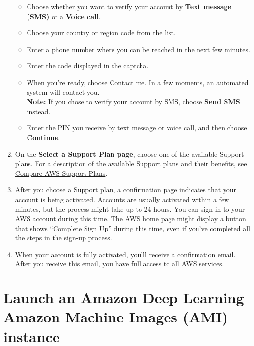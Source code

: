 \documentclass[]{book}
\providecommand{\tightlist}{%
  \setlength{\itemsep}{0pt}\setlength{\parskip}{0pt}}
\begin{document}
\begin{enumerate}
  \begin{itemize}
  \tightlist
  \item
    Choose whether you want to verify your account by \textbf{Text message (SMS)} or a \textbf{Voice call}.
  \item
    Choose your country or region code from the list.
  \item
    Enter a phone number where you can be reached in the next few minutes.
  \item
    Enter the code displayed in the captcha.
  \item
    When you're ready, choose Contact me. In a few moments, an automated system will contact you.\\
    \textbf{Note:} If you chose to verify your account by SMS, choose \textbf{Send SMS} instead.
  \item
    Enter the PIN you receive by text message or voice call, and then choose \textbf{Continue}.
  \end{itemize}
\item
  On the \textbf{Select a Support Plan page}, choose one of the available Support plans. For a description of the available Support plans and their benefits, see \href{https://aws.amazon.com/premiumsupport/plans/}{Compare AWS Support Plans}.
\item
  After you choose a Support plan, a confirmation page indicates that your account is being activated. Accounts are usually activated within a few minutes, but the process might take up to 24 hours. You can sign in to your AWS account during this time. The AWS home page might display a button that shows ``Complete Sign Up'' during this time, even if you've completed all the steps in the sign-up process.
\item
  When your account is fully activated, you'll receive a confirmation email. After you receive this email, you have full access to all AWS services.
\end{enumerate}

\hypertarget{launch-an-amazon-deep-learning-amazon-machine-images-ami-instance}{%
\chapter{Launch an Amazon Deep Learning Amazon Machine Images (AMI) instance}\label{launch-an-amazon-deep-learning-amazon-machine-images-ami-instance}}
\end{document}
